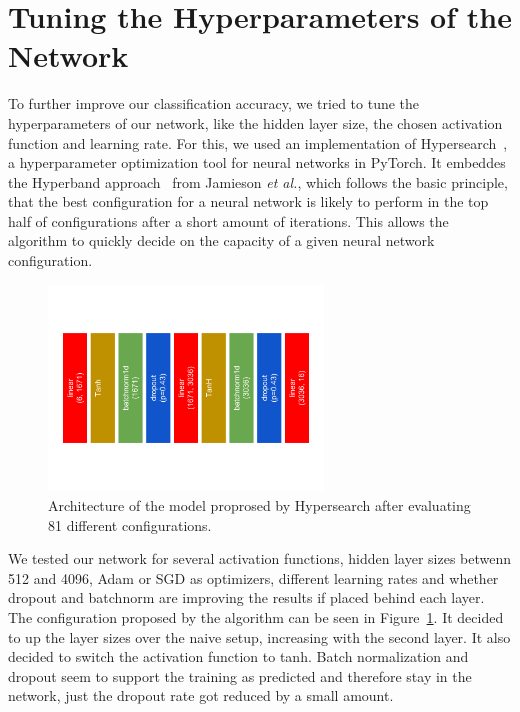 \section{Tuning the Hyperparameters of the Network}

To further improve our classification accuracy, we tried to tune the
hyperparameters of our network, like the hidden layer size, the chosen
activation function and learning rate. For this, we used an
implementation of Hypersearch~\cite{hypersearch}, a hyperparameter
optimization tool for neural networks in PyTorch. It embeddes the
Hyperband approach~\cite{hyperband} from Jamieson \textit{et al.}, which
follows the basic principle, that the best configuration for a neural
network is likely to perform in the top half of configurations after a
short amount of iterations. This allows the algorithm to quickly decide
on the capacity of a given neural network configuration.\\
\begin{figure}
	\centering
	\includegraphics[width=0.65\textwidth]{images/modeltuned.png}
	\caption{Architecture of the model proprosed by Hypersearch after
	evaluating 81 different configurations.}
	\label{modeltuned}
\end{figure}
We tested our network for several activation functions, hidden layer
sizes betwenn 512 and 4096, Adam or SGD as optimizers, different
learning rates and whether dropout and batchnorm are improving the
results if placed behind each layer. The configuration proposed by the
algorithm can be seen in Figure~\ref{modeltuned}. It decided to up the
layer sizes over the naive setup, increasing with the second layer. It
also decided to switch the activation function to tanh. Batch
normalization and dropout seem to support the training as predicted and
therefore stay in the network, just the dropout rate got reduced by a
small amount.\\
